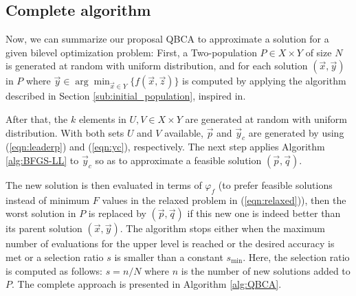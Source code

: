 \documentclass[conference]{IEEEtran}
\theoremstyle{definition}
\begin{document}


\subsection{Complete algorithm}

Now, we can summarize our proposal QBCA to approximate a solution for a given bilevel
optimization problem: First, a Two-population $P \in X \times Y$ of size $N$ is
generated at random with uniform distribution, and for each solution $(\vec{x}, \vec{y})$
in $P$ where $\vec{y} \in \arg \min_{\vec{x}\in Y} \{ f(\vec{x},\vec{z})\}$
is computed by applying the algorithm described in Section \ref{sub:initial_population},
inspired in\cite{Mejia2018}. 

After that, the $k$ elements in $U, V \in X\times Y$ are generated at random with
uniform distribution. With both sets $U$ and $V$ available, $\vec{p}$ and $\vec{y}_c$
are generated by using (\ref{eqn:leaderp}) and (\ref{eqn:yc}), respectively.
The next step applies Algorithm \ref{alg:BFGS-LL} to $\vec{y}_c$ so as to approximate
a feasible solution $(\vec{p}, \vec{q})$. 

The new solution is then evaluated in terms of $\varphi_f$ (to prefer feasible
solutions instead of minimum $F$ values in the relaxed problem in (\ref{eqn:relaxed})),
then the worst solution in $P$ is replaced by $(\vec{p}, \vec{q})$ if this new
one is indeed better than its parent solution $(\vec{x}, \vec{y})$. The algorithm
stops either when the maximum number of evaluations for the upper level is reached
or the desired accuracy is met or a selection ratio $s$ is smaller than a constant
$s_{\min}$. Here, the selection ratio is computed as follows: $ s = n /N$ where
$n$ is the number of new solutions added to $P$. The complete approach is presented in 
Algorithm \ref{alg:QBCA}.
\end{document}
